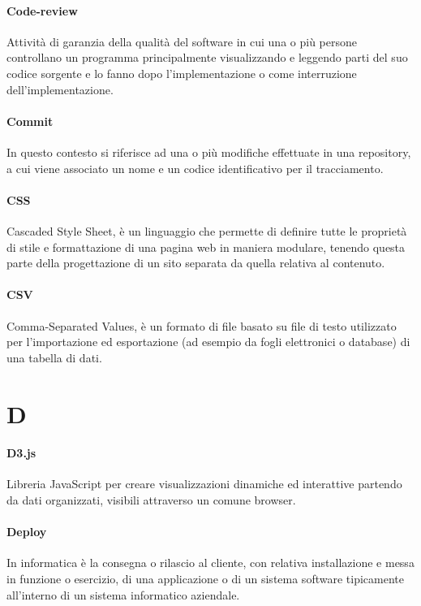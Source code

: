 \documentclass[]{article}
\begin{document}
	\paragraph*{Code-review}
	Attività di garanzia della qualità del software in cui una o più persone controllano un programma principalmente visualizzando e leggendo parti del suo codice sorgente e lo fanno dopo l'implementazione o come interruzione dell'implementazione.

	\paragraph*{Commit}
	In questo contesto si riferisce ad una o più modifiche effettuate in una repository, a cui viene associato un nome e un codice identificativo per il tracciamento.

	\paragraph*{CSS}
	Cascaded Style Sheet, è un linguaggio che permette di definire tutte le proprietà di stile e formattazione di una pagina web in maniera modulare, tenendo questa parte della progettazione di un sito separata da quella relativa al contenuto.

	\paragraph*{CSV}
	Comma-Separated Values, è un formato di file basato su file di testo utilizzato per l'importazione ed esportazione (ad esempio da fogli elettronici o database) di una tabella di dati.

	\newpage

	\section*{D}

	\paragraph*{D3.js}
	Libreria JavaScript per creare visualizzazioni dinamiche ed interattive partendo da dati organizzati, visibili attraverso un comune browser.

	\paragraph*{Deploy}
	In informatica è la consegna o rilascio al cliente, con relativa installazione e messa in funzione o esercizio, di una applicazione o di un sistema software tipicamente all’interno di un sistema informatico aziendale.
\end{document}
